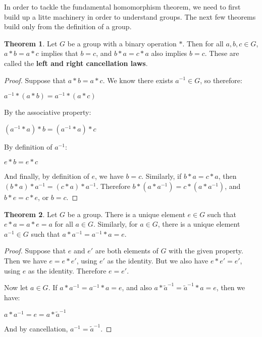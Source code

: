\documentclass[12pt]{article}
\newcommand{\inv}[1]{#1^{-1}}
\theoremstyle{definition}
\newtheorem{theorem}{Theorem}[section]
\newenvironment{thm}
{\theoremstyle{definition}
\begin{theorem}}
{\end{theorem}}
\begin{document}
In order to tackle the fundamental homomorphism theorem, we need to first build up a litte machinery in order to understand groups. The next few theorems build only from the definition of a group.

\begin{thm}
Let $G$ be a group with a binary operation $*$. Then for all $a, b, c \in G$, $a * b = a * c$ implies that $b = c$, and $b*a = c*a$ also implies $b=c$. These are called the \textbf{left and right cancellation laws}.
\end{thm}

\begin{proof}
Suppose that $a*b = a*c$. We know there exists $\inv{a} \in G$, so therefore:

\begin{center}
    $\inv{a} * (a*b) = \inv{a} * (a*c)$
\end{center}

By the associative property:

\begin{center}
    $(\inv{a} * a) * b = (\inv{a} * a) * c$
\end{center}

By definition of $\inv{a}$:

\begin{center}
    $e * b = e * c$
\end{center}

And finally, by definition of $e$, we have $b = c$. Similarly, if $b*a = c*a$, then $(b*a)*\inv{a} = (c*a)*\inv{a}$. Therefore $b*(a*\inv{a}) = c*(a*\inv{a})$, and $b*e = c*e$, or $b = c$.

\end{proof}

\begin{thm}
Let $G$ be a group. There is a unique element $e \in G$ such that $e*a = a*e = a$ for all $a \in G$. Similarly, for $a \in G$, there is a unique element $\inv{a} \in G$ such that $a*\inv{a} = \inv{a}*a = e$.
\end{thm}

\begin{proof}
Suppose that $e$ and $e'$ are both elements of $G$ with the given property. Then we have $e = e*e'$, using $e'$ as the identity. But we also have $e*e' = e'$, using $e$ as the identity. Therefore $e = e'$.

Now let $a \in G$. If $a*\inv{a} = \inv{a}*a = e$, and also $a*\inv{\tilde{a}} = \inv{\tilde{a}}*a = e$, then we have:

\begin{center}
    $a*\inv{a} = e = a*{\inv{\tilde{a}}}$
\end{center}

And by cancellation, $\inv{a} = \inv{\tilde{a}}$.

\end{proof}
\end{document}
